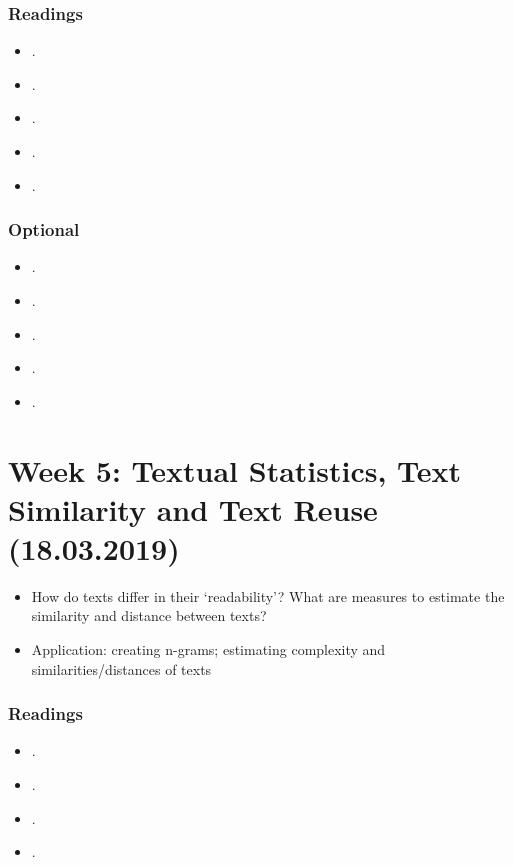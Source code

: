 \documentclass[abstract=on,parskip=full,headings=standardclasses,fontsize=11pt,paper=a4]{scrartcl}
\begin{document}
\subsubsection*{Readings}
\begin{itemize}
\item {}.
\item {}.
\item {}.
\item {}.
\item {}.
\end{itemize}

\subsubsection*{Optional}
\begin{itemize}
\item {}.
\item {}.
\item {}.
\item {}.
\item {}.
\end{itemize}

\section{Week 5: Textual Statistics, Text Similarity and Text Reuse (18.03.2019)}

\begin{itemize}
\item How do texts differ in their `readability'? What are measures to estimate the similarity and distance between texts?
\item Application: creating n-grams; estimating complexity and similarities/distances of texts
\end{itemize}

\subsubsection*{Readings}
\begin{itemize}
\item {}.
\item {}.
\item {}.
\item {}.
\end{itemize}
\end{document}
